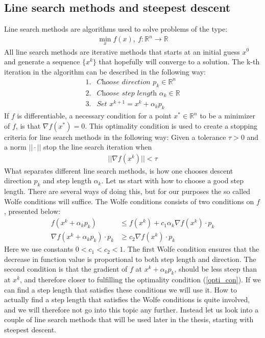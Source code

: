 \subsection{Line search methods and steepest descent}
Line search methods are algorithms used to solve problems of the type: 
\begin{align*}
\min_x f(x), \ f:\mathbb{R}^n\longrightarrow\mathbb{R}
\end{align*}
All line search methods are iterative methods that starts at an initial guess $x^0$ and generate a sequence $\{x^k\}$ that hopefully will converge to a solution. The k-th iteration in the algorithm can be described in the following way:
\begin{align*}
1. &\textit{Choose direction $p_k\in\mathbb{R}^n$} \\
2. &\textit{Choose step length $\alpha_k\in\mathbb{R}$} \\
3. &\textit{Set $x^{k+1}=x^k + \alpha_kp_k$} 
\end{align*}
If $f$ is differentiable, a necessary condition for a point $x^*\in\mathbb{R}^n$ to be a minimizer of $f$, is that $\nabla f(x^*)=0$. This optimality condition is used to create a stopping criteria for line search methods in the following way: Given a tolerance $\tau>0$ and a norm $||\cdot||$ stop the line search iteration when
\begin{align}
||\nabla f(x^k)||<\tau \label{opti_con}
\end{align}  
What separates different line search methods, is how one chooses descent direction $p_k$ and step length $\alpha_k$. Let us start with how to choose a good step length. There are several ways of doing this, but for our purposes the so called Wolfe conditions will suffice. The Wolfe conditions consists of two conditions on $f$, presented below:
\begin{align*}
f(x^k + \alpha_kp_k)&\leq f(x^k) + c_1\alpha_k\nabla f(x^k)\cdot p_k \\
\nabla f(x^k + \alpha_kp_k) \cdot p_k &\geq c_2 \nabla f(x^k)\cdot p_k
\end{align*}
Here we use constants $0<c_1<c_2<1$. The first Wolfe condition ensures that the decrease in function value is proportional to both step length and direction. The second condition is that the gradient of $f$ at $x^k + \alpha_kp_k$, should be less steep than at $x^k$, and therefore closer to fulfilling the optimality condition (\ref{opti_con}). If we can find a step length that satisfies these conditions we will use it. How to actually find a step length that satisfies the Wolfe conditions is quite involved, and we will therefore not go into this topic any further. Instead let us look into a couple of line search methods that will be used later in the thesis, starting with steepest descent.
